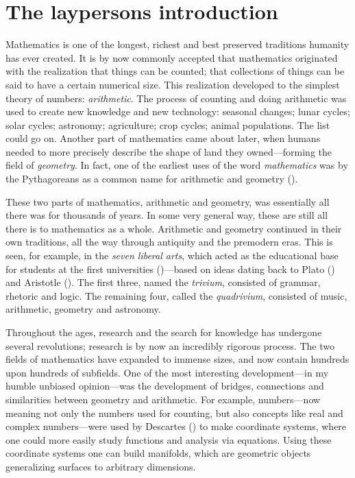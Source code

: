 
\section{The laypersons introduction}

Mathematics is one of the longest, richest and best preserved traditions humanity has ever created. It is by now commonly accepted that mathematics originated with the realization that things can be counted; that collections of things can be said to have a certain numerical size. This realization developed to the simplest theory of numbers: \emph{arithmetic}. The process of counting and doing arithmetic was used to create new knowledge and new technology: seasonal changes; lunar cycles; solar cycles; astronomy; agriculture; crop cycles; animal populations. The list could go on. Another part of mathematics came about later, when humans needed to more precisely describe the shape of land they owned---forming the field of \emph{geometry}. In fact, one of the earliest uses of the word \emph{mathematics} was by the Pythagoreans as a common name for arithmetic and geometry (\cite[1.1]{history}).

These two parts of mathematics, arithmetic and geometry, was essentially all there was for thousands of years. In some very general way, these are still all there is to mathematics as a whole. Arithmetic and geometry continued in their own traditions, all the way through antiquity and the premodern eras. This is seen, for example, in the \emph{seven liberal arts}, which acted as the educational base for students at the first universities (\cite{universities})---based on ideas dating back to Plato (\cite{plato}) and Aristotle (\cite{aristotle}). The first three, named the \emph{trivium}, consisted of grammar, rhetoric and logic. The remaining four, called the \emph{quadrivium}, consisted of music, arithmetic, geometry and astronomy.

Throughout the ages, research and the search for knowledge has undergone several revolutions; research is by now an incredibly rigorous process. The two fields of mathematics have expanded to immense sizes, and now contain hundreds upon hundreds of subfields. One of the most interesting development---in my humble unbiased opinion---was the development of bridges, connections and similarities between geometry and arithmetic. For example, numbers---now meaning not only the numbers used for counting, but also concepts like real and complex numbers---were used by Descartes (\cite{descartes}) to make coordinate systems, where one could more easily study functions and analysis via equations. Using these coordinate systems one can build manifolds, which are geometric objects generalizing surfaces to arbitrary dimensions. 

